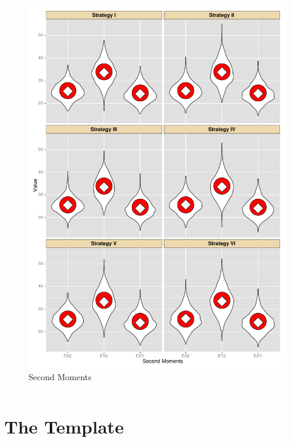 \documentclass[xetex]{beamer}
\begin{document}
\begin{frame}[plain]
\begin{columns}
			\begin{column}[t]{.5\textwidth}			
				\begin{figure}
					\caption{Second Moments}
					\includegraphics[height=.9\textheight, keepaspectratio]{./picts/secondMomentsBaragatti}
				\end{figure}	
			\end{column}
		\end{columns}	    
		
	
	\end{frame}

\section{The Template}
\end{document}
